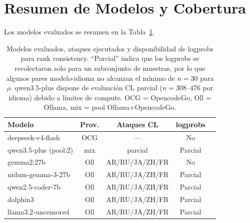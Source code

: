 \documentclass[11pt]{article}
\begin{document}
\section{Resumen de Modelos y Cobertura}
\label{sec:appendix_models}

Los modelos evaluados se resumen en la Tabla~\ref{tab:models_summary}.
 
\begin{table}[h]
  \centering\small
  \begin{tabular}{lcccc}
    \toprule
    \textbf{Modelo} & \textbf{Prov.} & \textbf{Ataques CL} & \textbf{logprobs} \\
    \midrule
    deepseek-v4-flash     & OCG & --- & No \\
    qwen3.5-plus (pool:2) & mix & parcial & Parcial \\
    gemma2:27b            & Oll & AR/RU/JA/ZH/FR & No \\
    nidum-gemma-3-27b     & Oll & AR/RU/JA/ZH/FR & Parcial \\
    qwen2.5-coder-7b      & Oll & AR/RU/JA/ZH/FR & Parcial \\
    dolphin3              & Oll & AR/RU/JA/ZH/FR & Parcial \\
    llama3.2-uncensored   & Oll & AR/RU/JA/ZH/FR & Parcial \\
    \bottomrule
  \end{tabular}
  \caption{Modelos evaluados, ataques ejecutados y disponibilidad
  de logprobs para rank consistency. ``Parcial'' indica que los logprobs
  se recolectaron solo para un subconjunto de muestras, por lo que
  algunos pares modelo-idioma no alcanzan el mínimo de $n = 30$ para
  $\rho$. qwen3.5-plus dispone de evaluación CL parcial
  ($n = 308$--$476$ por idioma) debido a límites de compute.
  OCG = OpencodeGo, Oll = Ollama, mix = pool Ollama+OpencodeGo.}
  \label{tab:models_summary}
\end{table}
 
\end{document}
